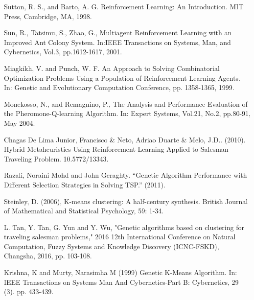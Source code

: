 \begin{thebibliography}{9}
Sutton,  R.  S.,  and  Barto,  A.  G. Reinforcement  Learning:  An  Introduction.  MIT  Press, Cambridge, MA, 1998.

Sun,  R.,  Tatsimu,  S.,  Zhao,  G.,  Multiagent  Reinforcement  Learning  with  an  Improved Ant  Colony  System.  In:IEEE  Transactions  on  Systems,  Man,  and  Cybernetics,  Vol.3, pp.1612-1617, 2001.

 Miagkikh,  V.  and  Punch,  W.  F.  An  Approach  to  Solving  Combinatorial  Optimization Problems   Using   a   Population   of   Reinforcement   Learning   Agents.   In: Genetic   and Evolutionary Computation Conference, pp. 1358-1365, 1999. 

 Monekosso,  N.,  and  Remagnino,  P.,  The  Analysis  and  Performance  Evaluation  of  the Pheromone-Q-learning Algorithm. In: Expert Systems, Vol.21, No.2, pp.80-91, May 2004. 

Chagas De Lima Junior, Francisco \& Neto, Adriao Duarte \& Melo, J.D.. (2010). Hybrid Metaheuristics Using Reinforcement Learning Applied to Salesman Traveling Problem. 10.5772/13343.

Razali, Noraini Mohd and John Geraghty. “Genetic Algorithm Performance with Different Selection Strategies in Solving TSP.” (2011).

Steinley, D. (2006), K-means clustering: A half-century synthesis. British Journal of Mathematical and Statistical Psychology, 59: 1-34.

L. Tan, Y. Tan, G. Yun and Y. Wu, "Genetic algorithms based on clustering for traveling salesman problems," 2016 12th International Conference on Natural Computation, Fuzzy Systems and Knowledge Discovery (ICNC-FSKD), Changsha, 2016, pp. 103-108.

Krishna, K and Murty, Narasimha M (1999) Genetic K-Means Algorithm. In: IEEE Transactions on Systems Man And Cybernetics-Part B: Cybernetics, 29 (3). pp. 433-439.
\end{thebibliography}
